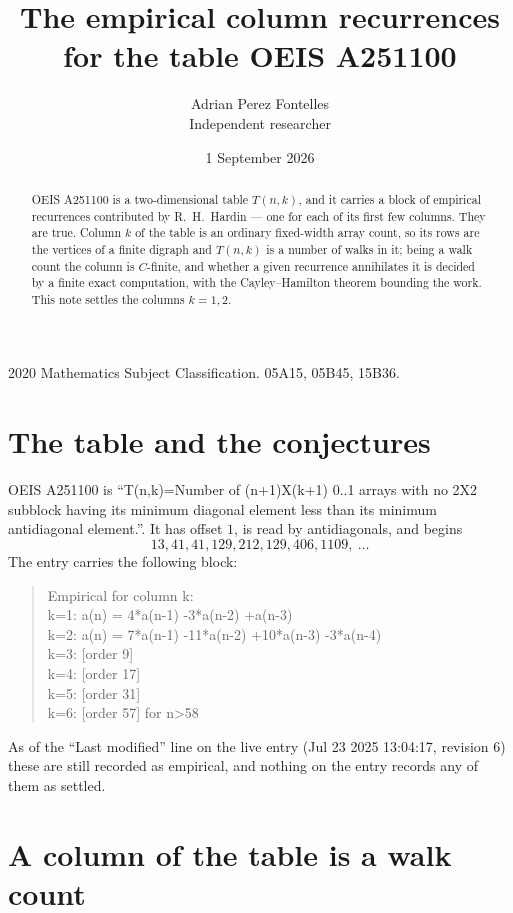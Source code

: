 \documentclass[11pt,a4paper]{article}
\title{The empirical column recurrences for the table OEIS A251100}
\author{Adrian Perez Fontelles\\ \small Independent researcher}
\date{1 September 2026}
\theoremstyle{plain}
\theoremstyle{definition}
\begin{document}
\maketitle

\begin{abstract}
OEIS A251100 is a two-dimensional table $T(n,k)$, and it carries a block of empirical
recurrences contributed by R.~H.~Hardin --- one for each of its first few columns. They are
true. Column $k$ of the table is an ordinary fixed-width array count, so its rows are the
vertices of a finite digraph and $T(n,k)$ is a number of walks in it; being a walk count the
column is $C$-finite, and whether a given recurrence annihilates it is decided by a finite
exact computation, with the Cayley--Hamilton theorem bounding the work. This note settles the
columns $k=1, 2$.
\end{abstract}

\noindent\small 2020 Mathematics Subject Classification. 05A15, 05B45, 15B36.\normalsize

\section{The table and the conjectures}

OEIS A251100 is ``T(n,k)=Number of (n+1)X(k+1) 0..1 arrays with no 2X2 subblock having its minimum diagonal element less than its minimum antidiagonal element.''. It has offset $1$, is
read by antidiagonals, and begins
\[
13, 41, 41, 129, 212, 129, 406, 1109,\ \dots
\]
The entry carries the following block:
\begin{quote}\small
Empirical for column k:\\
k=1: a(n) = 4*a(n-1) -3*a(n-2) +a(n-3)\\
k=2: a(n) = 7*a(n-1) -11*a(n-2) +10*a(n-3) -3*a(n-4)\\
k=3: [order 9]\\
k=4: [order 17]\\
k=5: [order 31]\\
k=6: [order 57] for n>58\\
\end{quote}
As of the ``Last modified'' line on the live entry (Jul 23 2025 13:04:17, revision 6) these are still
recorded as empirical, and nothing on the entry records any of them as settled.

\section{A column of the table is a walk count}
\end{document}
